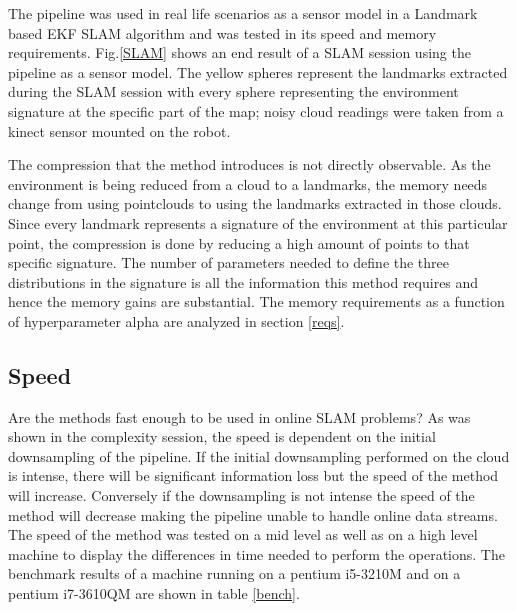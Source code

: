 \documentclass[twoside,hidelinks]{article}
\begin{document}
The pipeline was used in real life scenarios as a sensor model in a Landmark based EKF SLAM algorithm and was tested in its speed and memory requirements. Fig.\ref{SLAM} shows an end result of a SLAM session using the pipeline as a sensor model. The yellow spheres represent the landmarks extracted during the SLAM session with every sphere representing the environment signature at the specific part of the map; noisy cloud readings were taken from a kinect sensor mounted on the robot.


The compression that the method introduces is not directly observable. As the environment is being reduced from a cloud to a landmarks, the memory needs change from using pointclouds to using the landmarks extracted in those clouds. Since every landmark represents a signature of the environment at this particular point, the compression is done by reducing a high amount of points to that specific signature. The number of parameters needed to define the three distributions in the signature is all the information this method requires and hence the memory gains are substantial. The memory requirements as a function of hyperparameter alpha are analyzed in section \ref{reqs}. 

\subsection{Speed}

Are the methods fast enough to be used in online SLAM problems? 
As was shown in the complexity session, the speed is dependent on the initial downsampling of the pipeline. If the initial downsampling performed on the cloud is intense, there will be significant information loss but the speed of the method will increase. Conversely if the downsampling is not intense the speed of the method will decrease making the pipeline unable to handle online data streams. The speed of the method was tested on a mid level as well as on a high level machine to display the differences in time needed to perform the operations. The benchmark results of a machine running on a pentium i5-3210M and on a pentium i7-3610QM are shown in table \ref{bench}.
\end{document}

